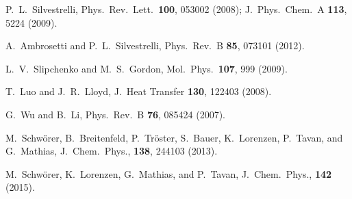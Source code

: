 \documentclass[twoside,10pt,titlepage,a4paper]{article}
\begin{document}
\begin{thebibliography}{999}
      P.~L.~Silvestrelli, Phys.~Rev.~Lett.~{\bf 100}, 053002 (2008);
       J.~Phys.~Chem.~A {\bf 113}, 5224 (2009).

     A.~Ambrosetti and P.~L.~Silvestrelli, Phys.~Rev.~B {\bf 85}, 073101 (2012).

     L.~V.~Slipchenko and M.~S.~Gordon, 
     Mol.~Phys.~{\bf 107}, 999 (2009).

    T.~Luo and J.~R.~Lloyd, J.~Heat Transfer {\bf 130}, 122403 (2008).

    G.~Wu and B.~Li, Phys.~Rev.~B {\bf 76}, 085424 (2007).

M.~Schw\"{o}rer, B.~Breitenfeld, P.~Tr\"{o}ster, S.~Bauer, K.~Lorenzen, P.~Tavan, and G.~Mathias,
 J.\ Chem.\ Phys., {\bf 138},  244103  (2013).

M.~Schw\"{o}rer, K.~Lorenzen, G.~Mathias, and P.~Tavan,
 J.\ Chem.\ Phys., {\bf 142}   (2015).



\end{thebibliography}
%

%
%
\cleardoublepage

\renewenvironment{theindex}%
{\newpage%
\section*{Index}%
\addcontentsline{toc}{section}{Index}%
\begin{multicols}{2}%
\par\bigskip%
\begin{list}%
{}%
{%
\setlength{\leftmargin}{3em}
\setlength{\itemindent}{0pt}
\setlength{\parsep}{0pt}
\setlength{\itemsep}{0pt}
\setlength{\itemindent}{-3em}}
}%
{\end{list}\end{multicols}}%

\printindex

%
\end{document}
